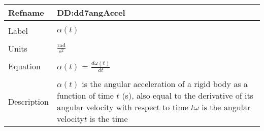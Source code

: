\documentclass[12pt]{article}
\begin{document}
~\newline
\noindent \begin{minipage}{\textwidth}
\begin{tabular}{p{} p{}}
\toprule \textbf{Refname} & \textbf{DD:dd7angAccel}
\label{DD:dd7angAccel}
\\ \midrule \\
Label & $\alpha{}(t)$
\\ \midrule \\
Units & $\frac{\text{rad}}{\text{s}^{2}}$
\\ \midrule \\
Equation & $\alpha{}(t)$ = $\frac{d\omega{}(t)}{dt}$
\\ \midrule \\
Description & $\alpha{}(t)$ is the angular acceleration of a rigid body as a function of time $t$ (s), also equal to the derivative of its angular velocity with respect to time $t$\newline$\omega{}$ is the angular velocity\newline$t$ is the time
\\ \bottomrule \end{tabular}
\end{minipage}\\
~\newline
\end{document}
